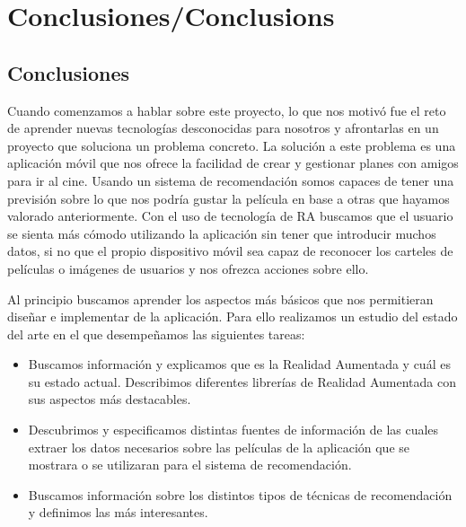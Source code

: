 
\cleardoublepage


\chapter{Conclusiones/Conclusions}
\label{makereference5}

\section{Conclusiones}
\label{makereference5.1}
Cuando comenzamos a hablar sobre este proyecto, lo que nos motivó fue el
 reto de aprender nuevas tecnologías desconocidas para nosotros y afrontarlas
 en un proyecto que soluciona un problema concreto. La solución a este problema
 es una aplicación móvil que nos ofrece la facilidad de crear y gestionar
 planes con amigos para ir al cine. Usando un sistema de recomendación somos
 capaces de tener una previsión sobre lo que nos podría gustar la película en
 base a otras que hayamos valorado anteriormente.
 Con el uso de tecnología de RA buscamos que el usuario se sienta más cómodo
 utilizando la aplicación sin tener que introducir muchos datos, si no que el
 propio dispositivo móvil sea capaz de reconocer los carteles de películas o
 imágenes de usuarios y nos ofrezca acciones sobre ello.

Al principio buscamos aprender los aspectos más básicos que nos permitieran
 diseñar e implementar de la aplicación. Para ello realizamos un estudio
 del estado del arte en el que desempeñamos las siguientes tareas:
\begin{itemize}  
    \item Buscamos información y explicamos que es la Realidad Aumentada y cuál
     es su estado actual. Describimos diferentes librerías de Realidad Aumentada
     con sus aspectos más destacables.
    \item Descubrimos y especificamos distintas fuentes de información de las
     cuales extraer los datos necesarios sobre las películas de la aplicación
     que se mostrara o se utilizaran para el sistema de recomendación.
    \item Buscamos información sobre los distintos tipos de técnicas de
     recomendación y definimos las más interesantes.
\end{itemize}

